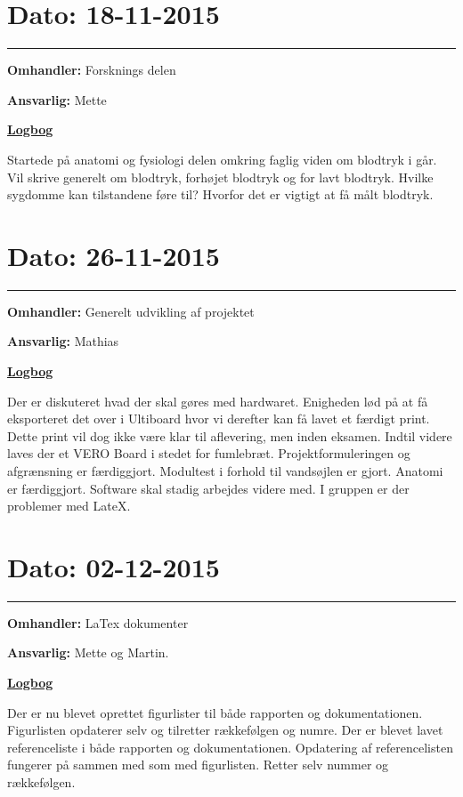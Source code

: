 \section{Dato: 18-11-2015}
\hrule
\textbf{Omhandler:} Forsknings delen 

\textbf{Ansvarlig:} Mette

\underline{\textbf{Logbog}}

Startede på anatomi og fysiologi delen omkring faglig viden om blodtryk i går. Vil skrive generelt om blodtryk, forhøjet blodtryk og for lavt blodtryk. Hvilke sygdomme kan tilstandene føre til? Hvorfor det er vigtigt at få målt blodtryk. 
\\
\newpage
\section{Dato: 26-11-2015}
\hrule
\textbf{Omhandler:} Generelt udvikling af projektet

\textbf{Ansvarlig:} Mathias

\underline{\textbf{Logbog}}

Der er diskuteret hvad der skal gøres med hardwaret. Enigheden lød på at få eksporteret det over i Ultiboard hvor vi derefter kan få lavet et færdigt print. Dette print vil dog ikke være klar til aflevering, men inden eksamen. Indtil videre laves der et VERO Board i stedet for fumlebræt.
Projektformuleringen og afgrænsning er færdiggjort. Modultest i forhold til vandsøjlen er gjort. Anatomi er færdiggjort. Software skal stadig arbejdes videre med. I gruppen er der problemer med LateX. 
\\

\section{Dato: 02-12-2015}
\hrule
\textbf{Omhandler:} LaTex dokumenter

\textbf{Ansvarlig:} Mette og Martin. 

\underline{\textbf{Logbog}}

Der er nu blevet oprettet figurlister til både rapporten og dokumentationen. Figurlisten opdaterer selv og tilretter rækkefølgen og numre. Der er blevet lavet referenceliste i både rapporten og dokumentationen. Opdatering af referencelisten fungerer på sammen med som med figurlisten. Retter selv nummer og rækkefølgen.  
\\